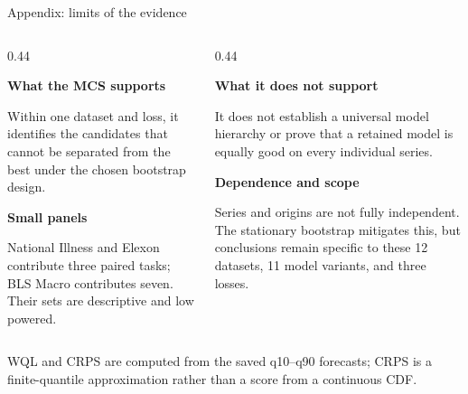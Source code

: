 \documentclass[aspectratio=169,10pt]{beamer}
\begin{document}
\begin{frame}[noframenumbering]{Appendix: limits of the evidence}
  \vspace{0.05cm}
  \begin{columns}[T,totalwidth=0.94\linewidth]
    \begin{column}{0.44\linewidth}
      \colorbox{TealLight}{\parbox{0.92\linewidth}{
        \textbf{What the MCS supports}\par\vspace{0.06cm}
        \fontsize{8.0}{9.2}\selectfont
        Within one dataset and loss, it identifies the candidates that cannot
        be separated from the best under the chosen bootstrap design.}}

      \vspace{0.18cm}
      \colorbox{GoldLight}{\parbox{0.92\linewidth}{
        \textbf{Small panels}\par\vspace{0.06cm}
        \fontsize{8.0}{9.2}\selectfont
        National Illness and Elexon contribute three paired tasks; BLS Macro
        contributes seven. Their sets are descriptive and low powered.}}
    \end{column}

    \begin{column}{0.44\linewidth}
      \colorbox{PurpleLight}{\parbox{0.92\linewidth}{
        \textbf{What it does not support}\par\vspace{0.06cm}
        \fontsize{8.0}{9.2}\selectfont
        It does not establish a universal model hierarchy or prove that a
        retained model is equally good on every individual series.}}

      \vspace{0.18cm}
      \colorbox{CoralLight}{\parbox{0.92\linewidth}{
        \textbf{Dependence and scope}\par\vspace{0.06cm}
        \fontsize{8.0}{9.2}\selectfont
        Series and origins are not fully independent. The stationary bootstrap
        mitigates this, but conclusions remain specific to these 12 datasets,
        11 model variants, and three losses.}}
    \end{column}
  \end{columns}

  \vspace{0.22cm}
  \begin{center}
    \colorbox{Paper}{\parbox{0.86\linewidth}{\centering\scriptsize
      WQL and CRPS are computed from the saved q10--q90 forecasts; CRPS is a
      finite-quantile approximation rather than a score from a continuous CDF.}}
  \end{center}
\end{frame}
\end{document}
